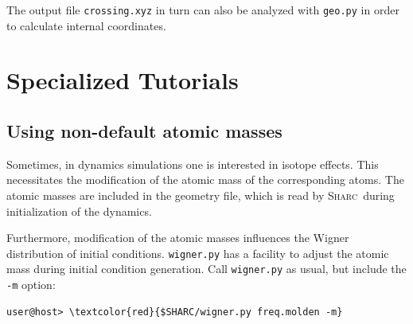 \documentclass[a4paper,11pt,DIV=15,openany]{scrbook}
\newcommand{\sharc}{\textsc{Sharc}}
\newcommand{\ttt}[1]{\texttt{#1}}
\begin{document}
\normalsize
The output file \ttt{crossing.xyz} in turn can also be analyzed with \ttt{geo.py} in order to calculate internal coordinates. 







\chapter{Specialized Tutorials}

\section{Using non-default atomic masses}

Sometimes, in dynamics simulations one is interested in isotope effects. This necessitates the modification of the atomic mass of the corresponding atoms. The atomic masses are included in the geometry file, which is read by \sharc\ during initialization of the dynamics.

Furthermore, modification of the atomic masses influences the Wigner distribution of initial conditions. \ttt{wigner.py} has a facility to adjust the atomic mass during initial condition generation. Call \ttt{wigner.py} as usual, but include the \ttt{-m} option:
\begin{Verbatim}[commandchars=\\\{\}]
user@host> \textcolor{red}{$SHARC/wigner.py freq.molden -m}
\end{Verbatim}
\end{document}
